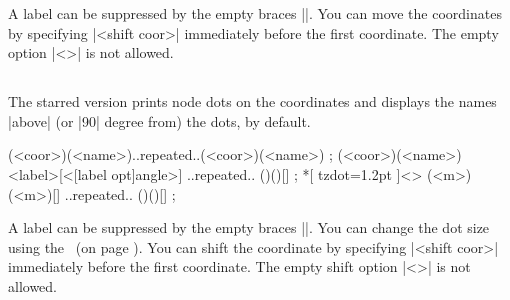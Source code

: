 \begin{tzcode}{.3}
{}
\end{tzcode}

A label can be suppressed by the empty braces |{}|.
You can move the coordinates by specifying |<shift coor>| immediately before the first coordinate. The empty option |<>| is not allowed.

\begin{tzcode}{.3}
\end{tzcode}


\subsection{\protect\cmd{\tzcoorsquick*}}
\label{ss:tzcoorsquick*}

The starred version \icmd{\tzcoorsquick*} prints node dots on the coordinates and displays the names |above| (or |90| degree from) the dots, by default.

\begin{tzdef}{}
\tzcoorsquick*(<coor>)(<name>)..repeated..(<coor>)(<name>) ;
(<coor>)(<name>){<label>}[<[label opt]angle>]
                                     ..repeated.. ()(){}[] ;
 *[ tzdot=1.2pt ]<> (<m>)(<m>){}[] ..repeated.. ()(){}[] ;
\end{tzdef}

\begin{tzcode}{.3}
{}
\end{tzcode}

A label can be suppressed by the empty braces |{}|.
You can change the dot size using the \threeways\ (on page \pageref{ss:threeways}).
You can shift the coordinate by specifying |<shift coor>| immediately before the first coordinate. The empty shift option |<>| is not allowed.

